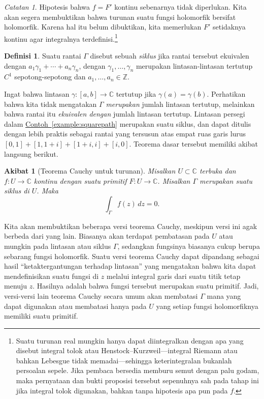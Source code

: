 \documentclass[12pt,openany]{book}
\newcommand{\C}{{\mathbb{C}}}
\newcommand{\Z}{{\mathbb{Z}}}
\newcommand{\myindex}[1]{#1\index{#1}}
\newcommand{\myquote}[1]{``#1''}
\theoremstyle{plain}
\newtheorem{cor}[thm]{Akibat}
\theoremstyle{remark}
\newtheorem{remark}[thm]{Catatan}
\theoremstyle{definition}
\newtheorem{defn}[thm]{Definisi}
\theoremstyle{exercise}
\theoremstyle{example}
\newcommand{\exampleref}[1]{\hyperref[#1]{Contoh~\ref*{#1}}}
\begin{document}
\begin{remark}
Hipotesis bahwa $f=F'$ kontinu sebenarnya tidak diperlukan.
Kita akan segera membuktikan bahwa turunan suatu fungsi holomorfik bersifat
holomorfik.  Karena hal itu belum dibuktikan, kita memerlukan $F'$ setidaknya
kontinu agar integralnya terdefinisi.\footnote{%
Suatu turunan real mungkin hanya dapat diintegralkan
dengan apa yang disebut integral tolok atau Henstock--Kurzweil---integral Riemann atau
bahkan Lebesgue tidak memadai---sehingga keterintegralan bukanlah persoalan sepele.
Jika pembaca bersedia memburu semut dengan palu godam, maka
pernyataan dan bukti proposisi tersebut sepenuhnya sah pada tahap ini
jika integral tolok digunakan, bahkan tanpa hipotesis apa pun pada $f$.}
\end{remark}

\begin{defn}
Suatu rantai $\Gamma$ 
disebut sebuah \emph{\myindex{siklus}} jika
rantai tersebut ekuivalen dengan
$a_1 \gamma_1 + \cdots + a_n \gamma_n$, dengan $\gamma_1, \ldots, \gamma_n$
merupakan lintasan-lintasan tertutup $C^1$ sepotong-sepotong
dan $a_1,\ldots,a_n \in \Z$.
\end{defn}

Ingat bahwa lintasan $\gamma \colon [a,b] \to \C$ tertutup jika $\gamma(a) = \gamma(b)$.
Perhatikan bahwa kita tidak mengatakan $\Gamma$ \emph{merupakan} jumlah lintasan
tertutup, melainkan bahwa rantai itu
\emph{ekuivalen dengan} jumlah lintasan tertutup.  Lintasan persegi dalam
\exampleref{example:squarepath} merupakan suatu siklus, dan dapat ditulis dengan lebih
praktis sebagai rantai yang tersusun atas empat ruas garis lurus $[0,1] +
[1,1+i]+[1+i,i]+[i,0]$.
Teorema dasar tersebut memiliki akibat langsung
berikut.

\begin{cor}[Teorema Cauchy untuk turunan] \label{cor:cauchyforders}
%
Misalkan $U \subset \C$ terbuka dan $f \colon U \to \C$
kontinu dengan suatu primitif
$F \colon U \to \C$.
Misalkan $\Gamma$ merupakan
suatu siklus
di $U$.
Maka
\begin{equation*}
\int_\Gamma f(z) \, dz = 0 .
\end{equation*}
\end{cor}

Kita akan membuktikan beberapa versi teorema Cauchy, meskipun versi ini
agak berbeda dari yang lain.  Biasanya akan terdapat pembatasan pada
$U$ atau mungkin pada lintasan atau siklus $\Gamma$,
sedangkan fungsinya biasanya cukup berupa sebarang fungsi holomorfik.
Suatu versi teorema Cauchy dapat dipandang sebagai hasil \myquote{ketaktergantungan terhadap lintasan}
yang mengatakan bahwa kita dapat mendefinisikan suatu fungsi di $z$ melalui integral garis
dari suatu titik tetap menuju $z$.  Hasilnya adalah bahwa fungsi tersebut merupakan
suatu primitif.  Jadi, versi-versi lain teorema Cauchy secara umum akan
membatasi $\Gamma$ mana yang dapat digunakan atau
membatasi hanya pada $U$ yang setiap fungsi holomorfiknya memiliki suatu primitif.
\end{document}
